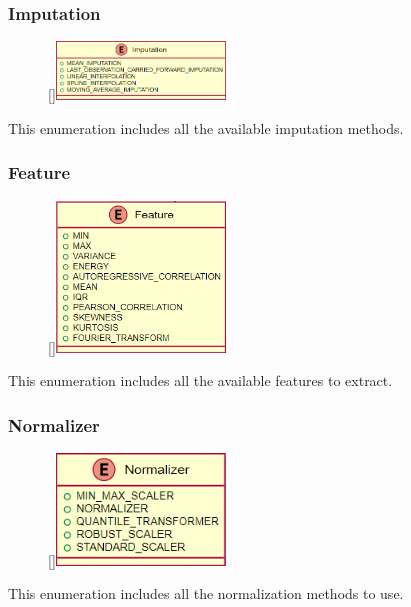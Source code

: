 \subsubsection{Imputation}
\begin{figure}
    \raisebox{0pt}[\dimexpr{}\baselineskip\relax]{\includegraphics[width=4.5cm]{classes/model-management/5.png}}
\end{figure} 
\par
This enumeration includes all the available imputation methods.
\newline
\newline

\subsubsection{Feature}
\begin{figure}
    \raisebox{0pt}[\dimexpr{}\baselineskip\relax]{\includegraphics[width=4.5cm]{classes/model-management/6.png}}
\end{figure} 
\par
This enumeration includes all the available features to extract.
\newline
\newline

\subsubsection{Normalizer}
\begin{figure}
    \raisebox{0pt}[\dimexpr{}\baselineskip\relax]{\includegraphics[width=4.5cm]{classes/model-management/7.png}}
\end{figure} 
\par
This enumeration includes all the normalization methods to use.
\newline
\newline

